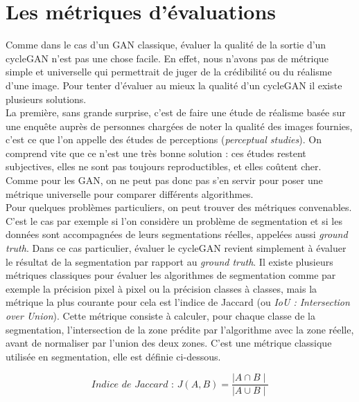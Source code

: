\section{Les métriques d'évaluations}

Comme dans le cas d'un GAN classique, évaluer la qualité de la sortie d'un cycleGAN n'est pas une chose facile. En effet, nous n'avons pas de métrique simple et universelle qui permettrait de juger de la crédibilité ou du réalisme d'une image. Pour tenter d'évaluer au mieux la qualité d'un cycleGAN il existe plusieurs solutions.\\

La première, sans grande surprise, c'est de faire une étude de réalisme basée sur une enquête auprès de personnes chargées de noter la qualité des images fournies, c'est ce que l'on appelle des études de perceptions (\textit{perceptual studies}). On comprend vite que ce n'est une très bonne solution : ces études restent subjectives, elles ne sont pas toujours reproductibles, et elles coûtent cher. Comme pour les GAN, on ne peut pas donc pas s'en servir pour poser une métrique universelle pour comparer différents algorithmes.\\

Pour quelques problèmes particuliers, on peut trouver des métriques convenables. C'est le cas par exemple si l'on considère un problème de segmentation et si les données sont accompagnées de leurs segmentations réelles, appelées aussi \textit{ground truth}. Dans ce cas particulier, évaluer le cycleGAN revient simplement à évaluer le résultat de la segmentation par rapport au \textit{ground truth}. Il existe plusieurs métriques classiques pour évaluer les algorithmes de segmentation comme par exemple la précision pixel à pixel ou la précision classes à classes, mais la métrique la plus courante pour cela est l'indice de Jaccard (ou \textit{IoU : Intersection over Union}). Cette métrique consiste à calculer, pour chaque classe de la segmentation, l'intersection de la zone prédite par l'algorithme avec la zone réelle, avant de normaliser par l'union des deux zones. C'est une métrique classique utilisée en segmentation, elle est définie ci-dessous.

$$ \textit{Indice de Jaccard : }J(A,B) = \frac{ \mid A \cap B \mid }{ \mid A \cup B \mid } $$

